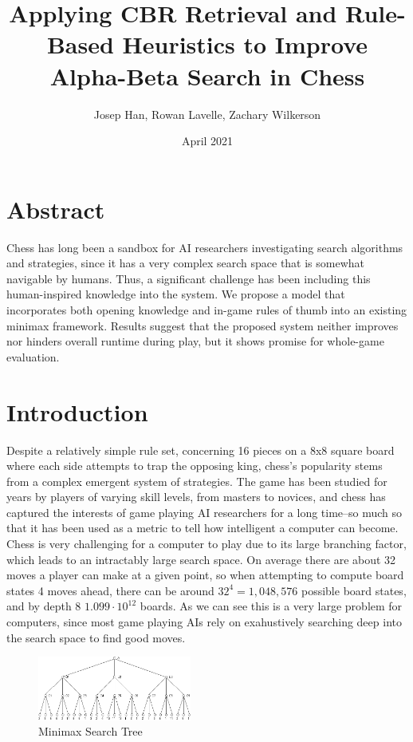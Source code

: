 \documentclass[letterpaper]{article}
\title{Applying CBR Retrieval and Rule-Based Heuristics to Improve Alpha-Beta Search in Chess}
\author{Josep Han, Rowan Lavelle, Zachary Wilkerson}
\date{April 2021}
\begin{document}
\maketitle
\section{Abstract}
Chess has long been a sandbox for AI researchers investigating search algorithms and strategies, since it has a very complex search space that is somewhat navigable by humans.  Thus, a significant challenge has been including this human-inspired knowledge into the system.  We propose a model that incorporates both opening knowledge and in-game rules of thumb into an existing minimax framework.  Results suggest that the proposed system neither improves nor hinders overall runtime during play, but it shows promise for whole-game evaluation.

\section{Introduction}
Despite a relatively simple rule set, concerning 16 pieces on a 8x8 square board where each side attempts to trap the opposing king, chess's popularity stems from a complex emergent system of strategies. The game has been studied for years by players of varying skill levels, from masters to novices, and chess has captured the interests of game playing AI researchers for a long time--so much so that it has been used as a metric to tell how intelligent a computer can become.  Chess is very challenging for a computer to play due to its large branching factor, which leads to an intractably large search space.  On average there are about 32 moves a player can make at a given point, so when attempting to compute board states 4 moves ahead, there can be around $32^4=1,048,576$ possible board states, and by depth 8 $1.099 \cdot 10^{12}$ boards. As we can see this is a very large problem for computers, since most game playing AIs rely on exahustively searching deep into the search space to find good moves.

\begin{figure}
    \centering
    \includegraphics[width=0.45\textwidth]{minimax.jpg}
    \caption{Minimax Search Tree}
    \label{minimax}
\end{figure}
\end{document}
